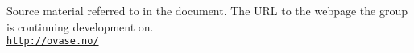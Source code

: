 \begin{thebibliography}{9}
	Source material referred to in the document.
	The URL to the webpage the group is continuing development on.
	\\\texttt{\url{http://ovase.no/}}
	
\end{thebibliography}

